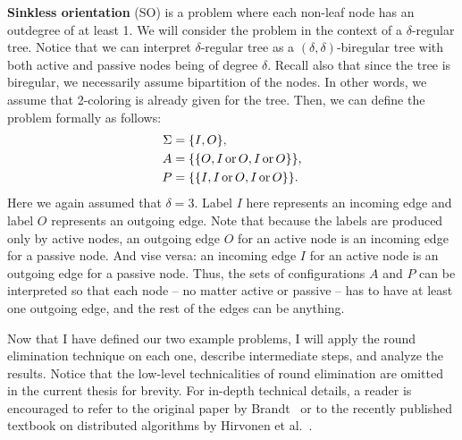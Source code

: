 \textbf{Sinkless orientation} (SO) is a problem
where each non-leaf node has an outdegree of at least 1.
We will consider the problem in the context of
a $\delta$-regular tree.
Notice that we can interpret $\delta$-regular
tree as a
$(\delta, \delta)$-biregular tree with
both active and passive nodes being of degree $\delta$.
Recall also that since the tree is biregular, we
necessarily assume bipartition of the nodes. In other words,
we assume that 2-coloring is already given for the tree.
Then, we can define the problem formally as follows:
\begin{align*}
\Sigma &= \{I, O\}, \\
A &= \{ \{O, I \operatorname{or} O, I \operatorname{or} O\} \}, \\
P &= \{ \{I, I \operatorname{or} O, I \operatorname{or} O\}\}.
\end{align*}
Here we again assumed that $\delta = 3$. Label $I$ here represents
an incoming edge and label $O$ represents an outgoing edge.
Note that because the labels are produced only by active nodes,
an outgoing edge $O$ for an active node is an incoming edge for a 
passive node. And vise versa: an incoming edge $I$ for an active node
is an outgoing edge for a passive node. Thus, the sets of configurations
$A$ and $P$ can be interpreted so that each node -- no matter active or passive --
has to have at least one outgoing edge, and the rest of the edges can be anything.

Now that I have defined our two example problems,
I will apply the round elimination
technique on each one, describe intermediate steps, and analyze the results.
Notice that the low-level technicalities of round elimination
are omitted in the current thesis for brevity. For in-depth technical details, a reader is encouraged
to refer to the original paper by Brandt~\cite{Brandt2019} or to the recently published textbook on distributed algorithms
by Hirvonen et al.~\cite{Hirvonen2020}.

